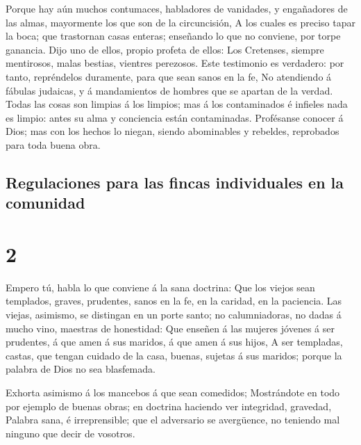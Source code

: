  Porque hay aún muchos contumaces, habladores de
vanidades, y engañadores de las almas, mayormente los que son de la
circuncisión,  A los cuales es preciso tapar la boca; que
trastornan casas enteras; enseñando lo que no conviene, por torpe
ganancia.  Dijo uno de ellos, propio profeta de ellos:
Los Cretenses, siempre mentirosos, malas bestias, vientres perezosos.
 Este testimonio es verdadero: por tanto, repréndelos
duramente, para que sean sanos en la fe,  No atendiendo á
fábulas judaicas, y á mandamientos de hombres que se apartan de la
verdad.  Todas las cosas son limpias á los limpios; mas á
los contaminados é infieles nada es limpio: antes su alma y conciencia
están contaminadas.  Profésanse conocer á Dios; mas con
los hechos lo niegan, siendo abominables y rebeldes, reprobados para
toda buena obra.

\hypertarget{regulaciones-para-las-fincas-individuales-en-la-comunidad}{%
\subsection{Regulaciones para las fincas individuales en la
comunidad}\label{regulaciones-para-las-fincas-individuales-en-la-comunidad}}

\hypertarget{section-56-2}{%
\section{2}\label{section-56-2}}

 Empero tú, habla lo que conviene á la sana doctrina:
 Que los viejos sean templados, graves, prudentes, sanos
en la fe, en la caridad, en la paciencia.  Las viejas,
asimismo, se distingan en un porte santo; no calumniadoras, no dadas á
mucho vino, maestras de honestidad:  Que enseñen á las
mujeres jóvenes á ser prudentes, á que amen á sus maridos, á que amen á
sus hijos,  A ser templadas, castas, que tengan cuidado de
la casa, buenas, sujetas á sus maridos; porque la palabra de Dios no sea
blasfemada.

 Exhorta asimismo á los mancebos á que sean comedidos;
 Mostrándote en todo por ejemplo de buenas obras; en
doctrina haciendo ver integridad, gravedad,  Palabra sana,
é irreprensible; que el adversario se avergüence, no teniendo mal
ninguno que decir de vosotros.

